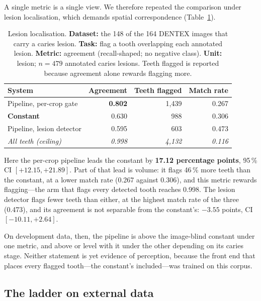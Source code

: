 \documentclass[conference]{IEEEtran}
\begin{document}
A single metric is a single view. We therefore repeated the comparison under
lesion localisation, which demands spatial correspondence
(Table~\ref{tab:lesion}).

\begin{table}[t]
\caption{Lesion localisation. \textbf{Dataset:} the 148 of the 164 DENTEX images
that carry a caries lesion.
\textbf{Task:} flag a tooth overlapping each annotated lesion. \textbf{Metric:}
agreement (recall-shaped; no negative class). \textbf{Unit:} lesion; $n = 479$
annotated caries lesions. Teeth flagged is reported because agreement alone
rewards flagging more.}
\label{tab:lesion}
\centering
\small
\setlength{\tabcolsep}{4pt}
\begin{tabular}{lrrr}
\toprule
System & Agreement & Teeth flagged & Match rate \\
\midrule
Pipeline, per-crop gate   & \textbf{0.802} & 1{,}439 & 0.267 \\
\textbf{Constant}             & 0.630          & 988 & 0.306 \\
Pipeline, lesion detector & 0.595          & 603 & 0.473 \\
\textit{All teeth (ceiling)}  & \textit{0.998} & \textit{4{,}132} &
\textit{0.116} \\
\bottomrule
\end{tabular}
\end{table}

Here the per-crop pipeline leads the constant by \textbf{17.12 percentage
points}, 95\,\% CI $[+12.15, +21.89]$. Part of that lead is volume: it flags
46\,\% more teeth than the constant, at a lower match rate (0.267 against 0.306),
and this metric rewards flagging---the arm that flags every detected tooth
reaches 0.998. The lesion detector flags fewer teeth than either, at the highest
match rate of the three (0.473), and its agreement is not separable from the
constant's: $-3.55$ points, CI $[-10.11, +2.64]$.

On development data, then, the pipeline is above the image-blind constant under
one metric, and above or level with it under the other depending on its caries
stage. Neither statement is yet evidence of perception, because the front end
that places every flagged tooth---the constant's included---was trained on this
corpus.

\subsection{The ladder on external data}
\end{document}
